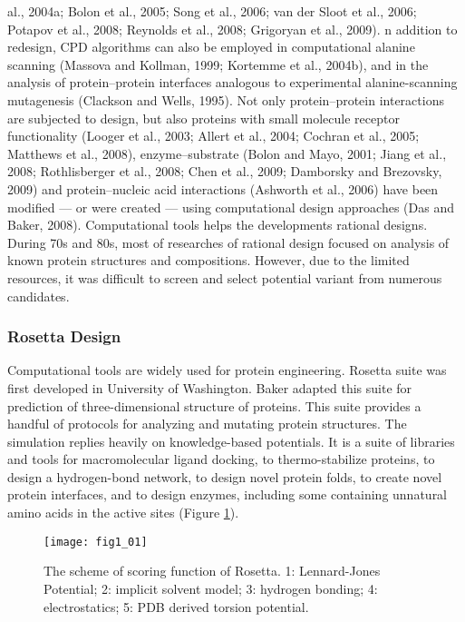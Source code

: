 \begin{refsection}
al., 2004a; Bolon et al., 2005; Song et al., 2006; van der Sloot et al., 2006;
Potapov et al., 2008; Reynolds et al., 2008; Grigoryan et al., 2009). n
addition to redesign, CPD algorithms can also be employed in computational
alanine scanning (Massova and Kollman, 1999; Kortemme et al., 2004b), and in
the analysis of protein–protein interfaces analogous to experimental
alanine-scanning mutagenesis (Clackson and Wells, 1995). Not only
protein–protein interactions are subjected to design, but also proteins with
small molecule receptor functionality (Looger et al., 2003; Allert et al.,
2004; Cochran et al., 2005; Matthews et al., 2008), enzyme–substrate (Bolon and
Mayo, 2001; Jiang et al., 2008; Rothlisberger et al., 2008; Chen et al., 2009;
Damborsky and Brezovsky, 2009) and protein–nucleic acid interactions (Ashworth
et al., 2006) have been modified — or were created — using computational design
approaches (Das and Baker, 2008).  Computational tools helps the developments
rational designs. During 70s and
80s, most of researches of rational design focused on analysis of known protein
structures and compositions. However, due to the limited resources, it was
difficult to screen and select potential variant from numerous candidates.

\subsubsection{Rosetta Design}

Computational tools are widely used for protein
engineering\cite{Rothlisberger2008,DiMaio2011a,Korkegian2005,
Leaver-Fay2013a,Leaver-Fay2011,Drew2013a,Kaufmann2010,Rohl2004}.
Rosetta suite was first developed in University of Washington. Baker  adapted this suite for prediction of three-dimensional structure of
proteins\cite{Leaver-Fay2011}. This suite provides a handful of protocols for
analyzing and mutating protein structures.  The simulation replies heavily on
knowledge-based potentials. It is a suite of libraries and tools for
macromolecular ligand docking, to thermo-stabilize proteins, to design a
hydrogen-bond network, to design novel protein folds, to create novel protein
interfaces, and to design enzymes, including some containing unnatural amino
acids in the active sites (Figure \ref{fig:rosetta-intro}).

\begin{figure}[h!] \centering \texttt{[image: fig1\_01]}
    \caption[The scheme of scoring function of Rosetta. 1: Lennard-Jones
    Potential; 2: implicit solvent model; 3: hydrogen bonding; 4:
electrostatics; 5: PDB drived torsion potential.]{The scheme of scoring
    function of Rosetta. 1: Lennard-Jones Potential; 2: implicit solvent model;
3: hydrogen bonding; 4: electrostatics; 5: PDB derived torsion potential.}
\label{fig:rosetta-intro}
\end{figure}


\end{refsection}
